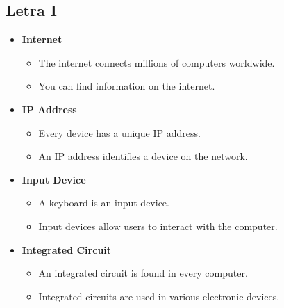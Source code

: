     \subsection{Letra I}
    \begin{itemize}
        \item \textbf{Internet}
        \begin{itemize}
            \item The internet connects millions of computers worldwide.
            \item You can find information on the internet.
        \end{itemize}
        \item \textbf{IP Address}
        \begin{itemize}
            \item Every device has a unique IP address.
            \item An IP address identifies a device on the network.
        \end{itemize}
        \item \textbf{Input Device}
        \begin{itemize}
            \item A keyboard is an input device.
            \item Input devices allow users to interact with the computer.
        \end{itemize}
        \item \textbf{Integrated Circuit}
        \begin{itemize}
            \item An integrated circuit is found in every computer.
            \item Integrated circuits are used in various electronic devices.
        \end{itemize}
    \end{itemize}

